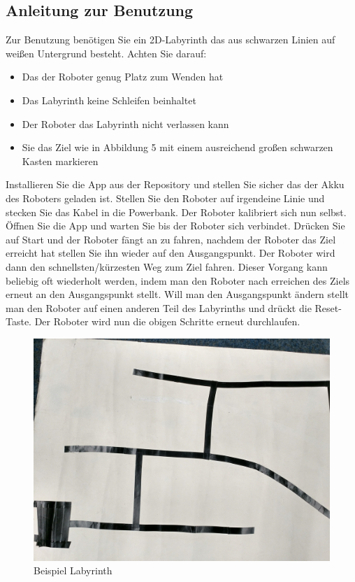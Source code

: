 \documentclass[12pt]{article}
\begin{document}
\subsection{Anleitung zur Benutzung}
Zur Benutzung benötigen Sie ein 2D-Labyrinth das aus schwarzen Linien auf weißen Untergrund besteht. Achten Sie darauf:
\begin{itemize}
\item Das der Roboter genug Platz zum Wenden hat
\item Das Labyrinth keine Schleifen beinhaltet
\item Der Roboter das Labyrinth nicht verlassen kann
\item Sie das Ziel wie in Abbildung 5 mit einem ausreichend großen schwarzen Kasten markieren
\end{itemize}
Installieren Sie die App aus der Repository\cite{Repo} und stellen Sie sicher das der Akku des Roboters geladen ist. Stellen Sie den Roboter auf irgendeine Linie und stecken Sie das Kabel in die Powerbank. Der Roboter kalibriert sich nun selbst. Öffnen Sie die App und warten Sie bis der Roboter sich verbindet. Drücken Sie auf Start und der Roboter fängt an zu fahren, nachdem der Roboter das Ziel erreicht hat stellen Sie ihn wieder auf den Ausgangspunkt. Der Roboter wird dann den schnellsten/kürzesten Weg zum Ziel fahren. Dieser Vorgang kann beliebig oft wiederholt werden, indem man den Roboter nach erreichen des Ziels erneut an den Ausgangspunkt stellt. Will man den Ausgangspunkt ändern stellt man den Roboter auf einen anderen Teil des Labyrinths und drückt die Reset-Taste. Der Roboter wird nun die obigen Schritte erneut durchlaufen.

\begin{figure}[thb]
\includegraphics[width=1\textwidth]{images/line_path.jpg}
\caption{Beispiel Labyrinth}
\end{figure}
\end{document}
